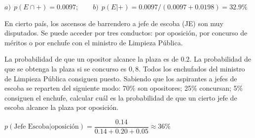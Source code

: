 $a)\ \ p(E \cap +)=0.0097;\qquad b)\ \ p(E|+)=0.0097/(0.0097+0.0198)=32.9\%$

\vspace{5mm}
\begin{ejemplo}
\begin{ejer}
En cierto país, los ascensos de barrendero a jefe de escoba (JE) son  muy disputados. Se puede acceder por tres conductos: por oposición, por concurso de méritos o por enchufe con el ministro de Limpieza Pública.

La probabilidad de que un opositor alcance la plaza es de $0.2$. La probabilidad de que se obtenga la plaza si se concurso es $0,8$. Todos los enchufados del ministro de Limpieza Pública consiguen puesto.
Sabiendo que los aspirantes a jefes de escoba se reparten del siguiente modo: 70\% son opositores; 25\% concursan; 5\% consiguen el enchufe, calcular cuál es la probabilidad de que un cierto jefe de escoba alcance la plaza por oposición.	
\end{ejer}
\end{ejemplo}

\begin{center}

$p(\text{Jefe Escoba}|\text{oposición})=\dfrac{0.14}{0.14+0.20+0.05} \approx 36 \%$
\end{center}


